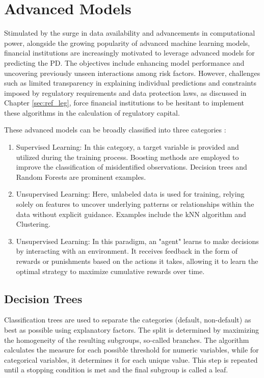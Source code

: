 \chapter{Advanced Models}
\label{ch:AM}
Stimulated by the surge in data availability and advancements in computational power, alongside the growing popularity of advanced machine learning models, financial institutions are increasingly motivated to leverage advanced models for predicting the \acl{PD}. The objectives include enhancing model performance and uncovering previously unseen interactions among risk factors. However, challenges such as limited transparency in explaining individual predictions and constraints imposed by regulatory requirements and data protection laws, as discussed in Chapter \ref{sec:ref_leg}, force financial institutions to be hesitant to implement these algorithms in the calculation of regulatory capital. \cite[p. 4]{EBA:2023}

These advanced models can be broadly classified into three categories \cite[p. 43-45]{Roberts2022}:

\begin{enumerate}
  \item Supervised Learning: In this category, a target variable is provided and utilized during the training process. Boosting methods are employed to improve the classification of misidentified observations. Decision trees and Random Forests are prominent examples.
\item Unsupervised Learning: Here, unlabeled data is used for training, relying solely on features to uncover underlying patterns or relationships within the data without explicit guidance. Examples include the kNN algorithm and Clustering.
\item Unsupervised Learning: In this paradigm, an "agent" learns to make decisions by interacting with an environment. It receives feedback in the form of rewards or punishments based on the actions it takes, allowing it to learn the optimal strategy to maximize cumulative rewards over time.
\end{enumerate}

\section{Decision Trees}
\label{sec:dectrees}
Classification trees are used to separate the categories (default, non-default) as best as possible using explanatory factors. The split is determined by maximizing the homogeneity of the resulting subgroups, so-called branches. The algorithm calculates the measure for each possible threshold for numeric variables, while for categorical variables, it determines it for each unique value. This step is repeated until a stopping condition is met and the final subgroup is called a leaf. 

